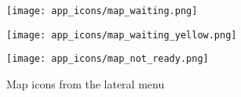 \begin{appendices}
\begin{figure*}[h!t]
	\begin{multicols}{4}
		\hspace{\linewidth} 
	    \texttt{[image: app\_icons/map\_waiting.png]}\par 
	    \texttt{[image: app\_icons/map\_waiting\_yellow.png]}\par 
	    \hspace{\linewidth}
    \end{multicols}

    \texttt{[image: app\_icons/map\_not\_ready.png]}

	\caption{Map icons from the lateral menu}
\end{figure*}


\end{appendices}